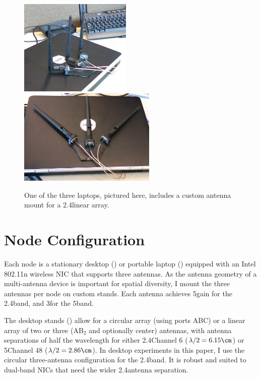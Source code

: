 \begin{figure}[ht]
	\centering
	\includegraphics[height=1.8in]{figures/laptop_stand_cropped_up.jpg}%
	\hspace{0.6in}%
	\includegraphics[height=1.8in]{figures/laptop_stand_cropped.jpg}
	\caption[A custom laptop antenna stand]{\label{fig:laptop_stands}One of the three laptops, pictured here, includes a custom antenna mount for a 2.4\GHz linear array.}
\end{figure}

\section{Node Configuration}
Each node is a stationary desktop () or portable laptop () equipped with an Intel 802.11n wireless NIC that supports three antennas. As the antenna geometry of a multi-antenna device is important for spatial diversity, I mount the three antennas per node on custom stands. Each antenna achieves 5\dBi gain for the 2.4\GHz band, and 3\dBi for the 5\GHz band.

The desktop stands () allow for a circular array (using ports ABC) or a linear array of two or three (AB$_2$ and optionally center) antennas, with antenna separations of half the wavelength for either 2.4\GHz Channel 6 ($\lambda/2 = 6.15\cm$) or 5\GHz Channel 48 ($\lambda/2=2.86\cm$). In desktop experiments in this paper, I use the circular three-antenna configuration for the 2.4\GHz band. It is robust and suited to dual-band NICs that need the wider 2.4\GHz antenna separation. 

